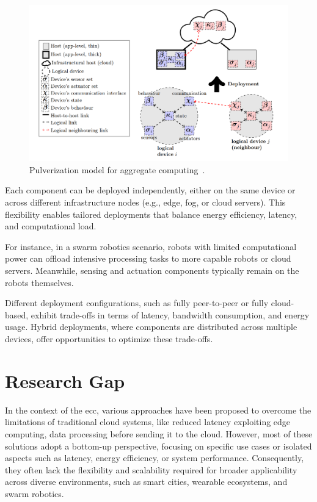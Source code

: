 \documentclass[runningheads]{llncs}
\begin{document}
\begin{figure}[t]
    \centering
    \includegraphics[width=\textwidth]{figures/image.png}
    \caption{Pulverization model for aggregate computing~\cite{DBLP:journals/fi/CasadeiPPVW20}.}
    \label{fig:pulverization-model}
\end{figure}

Each component can be deployed independently,
either on the same device or across different infrastructure nodes (e.g., edge, fog, or cloud servers).
%
This flexibility enables tailored deployments that balance energy efficiency,
latency,
and computational load.

For instance,
in a swarm robotics scenario,
robots with limited computational power can offload intensive processing tasks to more capable robots or cloud servers.
%
Meanwhile,
sensing and actuation components typically remain on the robots themselves.

Different deployment configurations,
such as fully peer-to-peer or fully cloud-based,
exhibit trade-offs in terms of latency, bandwidth consumption,
and energy usage.
%
Hybrid deployments,
where components are distributed across multiple devices,
offer opportunities to optimize these trade-offs.

\section{Research Gap}
\label{sec:research-gap}

In the context of the \ac{ecc},
various approaches have been proposed to overcome the limitations of traditional cloud systems,
like reduced latency exploiting edge computing,
data processing before sending it to the cloud.
%
However,
most of these solutions adopt a bottom-up perspective,
focusing on specific use cases or isolated aspects such as latency,
energy efficiency,
or system performance.
%
Consequently,
they often lack the flexibility and scalability required for broader applicability across diverse environments,
such as smart cities,
wearable ecosystems,
and swarm robotics.
\end{document}
